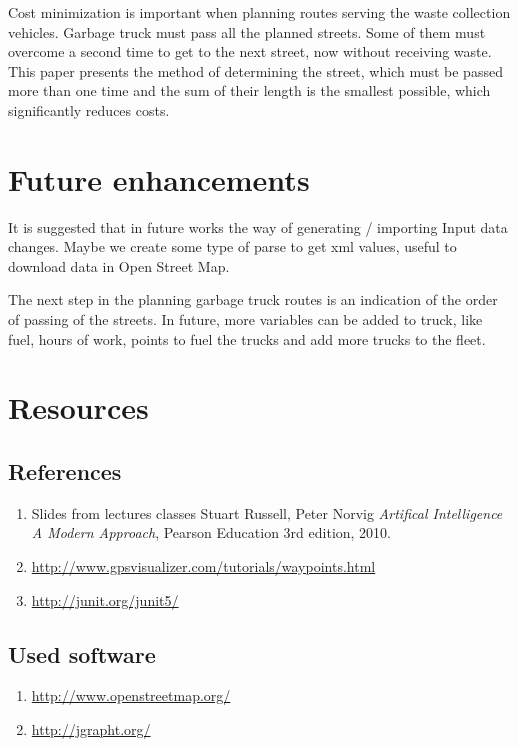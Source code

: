 \documentclass[a4paper]{article}
\begin{document}
Cost minimization is important when planning routes serving the waste collection vehicles. Garbage truck must pass all the planned streets. Some of them must overcome a second time to get to the next street, now without receiving waste.
This paper presents the method of determining the street, which must be passed more than one time and the sum of their length is the smallest possible, which significantly reduces costs. 

\section{Future enhancements} 

It is suggested that in future works the way of generating / importing
Input data changes. Maybe we create some type of parse to get xml values, useful to download data in Open Street Map. 

The next step in the planning garbage truck routes is an indication of the order of passing of the streets. In future, more variables can be added to truck, like fuel, hours of work, points to fuel the trucks and add more trucks to the fleet.
\newpage

\section{Resources}

\subsection{References}

\begin{enumerate}
	
	\item Slides from lectures classes
	Stuart Russell, Peter Norvig
	\emph{Artifical Intelligence A Modern Approach},
	Pearson Education
	3rd edition,
	2010.
	\item \url{http://www.gpsvisualizer.com/tutorials/waypoints.html} 
	\item \url{http://junit.org/junit5/}
	

\end{enumerate}

\subsection{Used software} \label{openStreet}
\begin{enumerate}
	
\item \url{http://www.openstreetmap.org/}\label{itm:openStreet}
\item \url{http://jgrapht.org/}

\end{enumerate}
\end{document}
